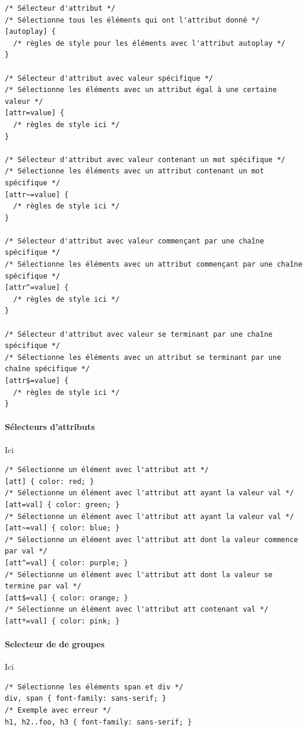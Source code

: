 \documentclass{report}
\begin{document}
\begin{multicols*}{2}
\begin{lstlisting}[style=CSSDraculaLight]
/* Sélecteur d'attribut */
/* Sélectionne tous les éléments qui ont l'attribut donné */
[autoplay] {
  /* règles de style pour les éléments avec l'attribut autoplay */
}

/* Sélecteur d'attribut avec valeur spécifique */
/* Sélectionne les éléments avec un attribut égal à une certaine valeur */
[attr=value] {
  /* règles de style ici */
}

/* Sélecteur d'attribut avec valeur contenant un mot spécifique */
/* Sélectionne les éléments avec un attribut contenant un mot spécifique */
[attr~=value] {
  /* règles de style ici */
}

/* Sélecteur d'attribut avec valeur commençant par une chaîne spécifique */
/* Sélectionne les éléments avec un attribut commençant par une chaîne spécifique */
[attr^=value] {
  /* règles de style ici */
}

/* Sélecteur d'attribut avec valeur se terminant par une chaîne spécifique */
/* Sélectionne les éléments avec un attribut se terminant par une chaîne spécifique */
[attr$=value] {
  /* règles de style ici */
}
\end{lstlisting}



\paragraph{Sélecteurs d'attributs} Ici

\begin{lstlisting}[style=CSSDraculaLight]
/* Sélectionne un élément avec l'attribut att */
[att] { color: red; }
/* Sélectionne un élément avec l'attribut att ayant la valeur val */
[att=val] { color: green; }
/* Sélectionne un élément avec l'attribut att ayant la valeur val */
[att~=val] { color: blue; }
/* Sélectionne un élément avec l'attribut att dont la valeur commence par val */
[att^=val] { color: purple; }
/* Sélectionne un élément avec l'attribut att dont la valeur se termine par val */
[att$=val] { color: orange; }
/* Sélectionne un élément avec l'attribut att contenant val */
[att*=val] { color: pink; }
\end{lstlisting}

\paragraph{Selecteur de de groupes} Ici

\begin{lstlisting}[style=CSSDraculaLight]
/* Sélectionne les éléments span et div */
div, span { font-family: sans-serif; }
/* Exemple avec erreur */
h1, h2..foo, h3 { font-family: sans-serif; }
\end{lstlisting}


\end{multicols*}
\end{document}
